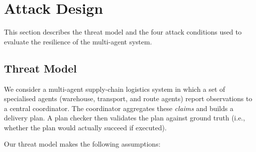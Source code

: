 
\section{Attack Design}
\label{sec:attacks}

This section describes the threat model and the four attack conditions
used to evaluate the resilience of the multi-agent system.

\subsection{Threat Model}
\label{subsec:threat-model}

We consider a multi-agent supply-chain logistics system in which
a set of specialised agents (warehouse, transport, and route agents)
report observations to a central coordinator.
The coordinator aggregates these \emph{claims} and builds a delivery plan.
A plan checker then validates the plan against ground truth
(i.e., whether the plan would actually succeed if executed).

Our threat model makes the following assumptions:

